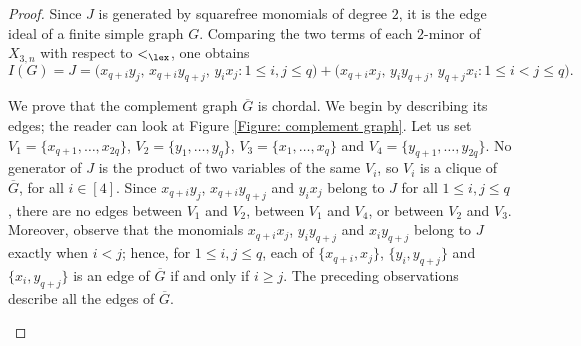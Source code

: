 \documentclass[12pt]{amsart}
\numberwithin{equation}{section}
\begin{document}
\begin{proof}
Since $J$ is generated by squarefree monomials of degree $2$, it is
	the edge ideal of a finite simple graph $G$. Comparing the two terms of each $2$-minor of
$X_{3,n}$ with respect to $<_{\lex}$, one obtains
\[		I(G)=J
		=\bigl(
		x_{q+i}y_j,\,
		x_{q+i}y_{q+j},\,
		y_ix_j
		:1\leq i,j\leq q
		\bigr)+
		\bigl(
		x_{q+i}x_j,\,
		y_i y_{q+j},\,
		y_{q+j}x_i
		:1\leq i<j\leq q
		\bigr).
\]
	
	We prove that the complement graph $\overline{G}$ is chordal. 
    We begin by describing its edges; the reader can look at Figure \ref{Figure: complement graph}. Let us set $V_1=\{x_{q+1},\ldots,x_{2q}\}$, $V_2=\{y_1,\ldots,y_q\}$, $V_3=\{x_1,\ldots,x_q\}$ and $V_4=\{y_{q+1},\ldots,y_{2q}\}$.
    No generator of $J$ is the product of two variables of the same
$V_i$, so $V_i$ is a clique of $\overline{G}$, for all $i\in [4]$. Since
$x_{q+i}y_j$, $x_{q+i}y_{q+j}$ and $y_ix_j$ belong to $J$ for all
$1\leq i,j\leq q$, there are no edges between $V_1$ and $V_2$,
between $V_1$ and $V_4$, or between $V_2$ and $V_3$. Moreover, observe that the monomials $x_{q+i}x_j$, $y_iy_{q+j}$ and
$x_iy_{q+j}$ belong to $J$ exactly when $i<j$; hence, for
$1\leq i,j\leq q$, each of
$\{x_{q+i},x_j\}$, $\{y_i,y_{q+j}\}$ and $\{x_i,y_{q+j}\}$ is an edge of
$\overline{G}$ if and only if $i\geq j$. The preceding observations describe all the edges of
	$\overline{G}$.
	

\begin{figure}[h]
\centering
{}
\end{figure}
\end{proof}
\end{document}
